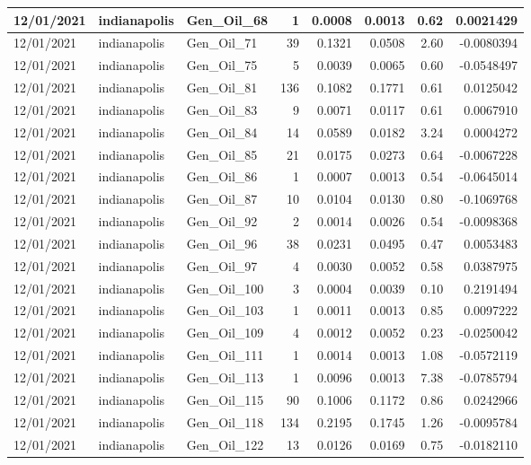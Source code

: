 \documentclass[
  letterpaper,
  DIV=11,
  numbers=noendperiod]{scrartcl}
\begin{document}
\begin{tabular}{l|l|l|r|r|r|r|r}
\hline
12/01/2021 & indianapolis & Gen\_Oil\_68 & 1 & 0.0008 & 0.0013 & 0.62 & 0.0021429\\
\hline
12/01/2021 & indianapolis & Gen\_Oil\_71 & 39 & 0.1321 & 0.0508 & 2.60 & -0.0080394\\
\hline
12/01/2021 & indianapolis & Gen\_Oil\_75 & 5 & 0.0039 & 0.0065 & 0.60 & -0.0548497\\
\hline
12/01/2021 & indianapolis & Gen\_Oil\_81 & 136 & 0.1082 & 0.1771 & 0.61 & 0.0125042\\
\hline
12/01/2021 & indianapolis & Gen\_Oil\_83 & 9 & 0.0071 & 0.0117 & 0.61 & 0.0067910\\
\hline
12/01/2021 & indianapolis & Gen\_Oil\_84 & 14 & 0.0589 & 0.0182 & 3.24 & 0.0004272\\
\hline
12/01/2021 & indianapolis & Gen\_Oil\_85 & 21 & 0.0175 & 0.0273 & 0.64 & -0.0067228\\
\hline
12/01/2021 & indianapolis & Gen\_Oil\_86 & 1 & 0.0007 & 0.0013 & 0.54 & -0.0645014\\
\hline
12/01/2021 & indianapolis & Gen\_Oil\_87 & 10 & 0.0104 & 0.0130 & 0.80 & -0.1069768\\
\hline
12/01/2021 & indianapolis & Gen\_Oil\_92 & 2 & 0.0014 & 0.0026 & 0.54 & -0.0098368\\
\hline
12/01/2021 & indianapolis & Gen\_Oil\_96 & 38 & 0.0231 & 0.0495 & 0.47 & 0.0053483\\
\hline
12/01/2021 & indianapolis & Gen\_Oil\_97 & 4 & 0.0030 & 0.0052 & 0.58 & 0.0387975\\
\hline
12/01/2021 & indianapolis & Gen\_Oil\_100 & 3 & 0.0004 & 0.0039 & 0.10 & 0.2191494\\
\hline
12/01/2021 & indianapolis & Gen\_Oil\_103 & 1 & 0.0011 & 0.0013 & 0.85 & 0.0097222\\
\hline
12/01/2021 & indianapolis & Gen\_Oil\_109 & 4 & 0.0012 & 0.0052 & 0.23 & -0.0250042\\
\hline
12/01/2021 & indianapolis & Gen\_Oil\_111 & 1 & 0.0014 & 0.0013 & 1.08 & -0.0572119\\
\hline
12/01/2021 & indianapolis & Gen\_Oil\_113 & 1 & 0.0096 & 0.0013 & 7.38 & -0.0785794\\
\hline
12/01/2021 & indianapolis & Gen\_Oil\_115 & 90 & 0.1006 & 0.1172 & 0.86 & 0.0242966\\
\hline
12/01/2021 & indianapolis & Gen\_Oil\_118 & 134 & 0.2195 & 0.1745 & 1.26 & -0.0095784\\
\hline
12/01/2021 & indianapolis & Gen\_Oil\_122 & 13 & 0.0126 & 0.0169 & 0.75 & -0.0182110\\

\end{tabular}
\end{document}

